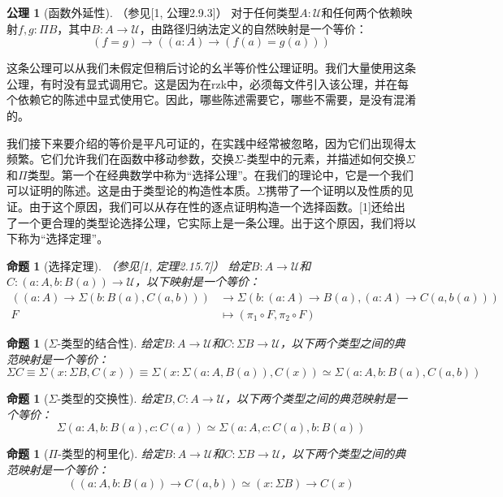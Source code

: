 \documentclass{ctexrep}
\theoremstyle{plain}
\newtheorem{proposition}[theorem]{命题}
\theoremstyle{definition}
\theoremstyle{remark}
\theoremstyle{definition}
\newtheorem{axiom}[theorem]{公理}
\theoremstyle{definition}
\theoremstyle{definition}
\newcommand{\UU}{\mathcal{U}}
\begin{document}
\begin{axiom}[函数外延性]（参见[1, 公理2.9.3]）
对于任何类型$A:\UU$和任何两个依赖映射$f,g:\Pi B$，其中$B:A\to\UU$，由路径归纳法定义的自然映射是一个等价：
\[
(f=g)\to \left((a:A)\to (f(a)=g(a))\right)
\]
\end{axiom}

这条公理可以从我们未假定但稍后讨论的幺半等价性公理证明。我们大量使用这条公理，有时没有显式调用它。这是因为在rzk中，必须每文件引入该公理，并在每个依赖它的陈述中显式使用它。因此，哪些陈述需要它，哪些不需要，是没有混淆的。

我们接下来要介绍的等价是平凡可证的，在实践中经常被忽略，因为它们出现得太频繁。它们允许我们在函数中移动参数，交换$\Sigma$-类型中的元素，并描述如何交换$\Sigma$和$\Pi$类型。第一个在经典数学中称为“选择公理”。在我们的理论中，它是一个我们可以证明的陈述。这是由于类型论的构造性本质。$\Sigma$携带了一个证明以及性质的见证。由于这个原因，我们可以从存在性的逐点证明构造一个选择函数。[1]还给出了一个更合理的类型论选择公理，它实际上是一条公理。出于这个原因，我们将以下称为“选择定理”。

\begin{proposition}[选择定理]（参见[1, 定理2.15.7]）
给定$B:A\to\UU$和$C:(a:A,b:B(a))\to\UU$，以下映射是一个等价：
\begin{align*}
((a:A)\to\Sigma(b:B(a),C(a,b))) &\to \Sigma(b:(a:A)\to B(a), (a:A)\to C(a,b(a))) \\
F &\mapsto (\pi_1\circ F,\pi_2\circ F)
\end{align*}
\end{proposition}

\begin{proposition}[$\Sigma$-类型的结合性]
给定$B:A\to\UU$和$C:\Sigma B\to\UU$，以下两个类型之间的典范映射是一个等价：
\[
\Sigma C \equiv \Sigma(x:\Sigma B,C(x)) \equiv \Sigma(x:\Sigma(a:A,B(a)),C(x)) \simeq \Sigma(a:A,b:B(a),C(a,b))
\]
\end{proposition}

\begin{proposition}[$\Sigma$-类型的交换性]
给定$B,C:A\to\UU$，以下两个类型之间的典范映射是一个等价：
\[
\Sigma(a:A,b:B(a),c:C(a)) \simeq \Sigma(a:A,c:C(a),b:B(a))
\]
\end{proposition}

\begin{proposition}[$\Pi$-类型的柯里化]
给定$B:A\to\UU$和$C:\Sigma B\to\UU$，以下两个类型之间的典范映射是一个等价：
\[
((a:A,b:B(a))\to C(a,b)) \simeq (x:\Sigma B)\to C(x)
\]
\end{proposition}
\end{document}
